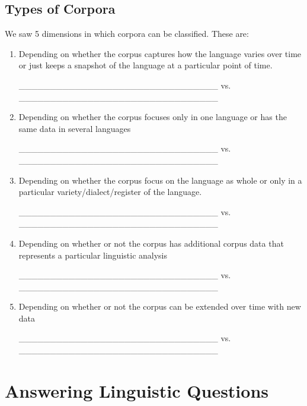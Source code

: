 \documentclass[a4paper,11pt]{scrartcl}
\begin{document}
\subsection{Types of Corpora}

We saw 5 dimensions in which corpora can be classified. These are:

\begin{enumerate}[label=\alph*)]
\onehalfspacing
\item Depending on whether the corpus captures how the language varies over
      time or just keeps a snapshot of the language at a particular point of
      time.

\_\_\_\_\_\_\_\_\_\_\_\_\_\_\_\_\_\_\_\_\_\_\_\_\_\_\_\_\_\_\_\_ vs.
\_\_\_\_\_\_\_\_\_\_\_\_\_\_\_\_\_\_\_\_\_\_\_\_\_\_\_\_\_\_\_\_

\item Depending on whether the corpus focuses only in one language or has the
      same data in several languages

\_\_\_\_\_\_\_\_\_\_\_\_\_\_\_\_\_\_\_\_\_\_\_\_\_\_\_\_\_\_\_\_ vs.
\_\_\_\_\_\_\_\_\_\_\_\_\_\_\_\_\_\_\_\_\_\_\_\_\_\_\_\_\_\_\_\_

\item Depending on whether the corpus focus on the language as whole or only
      in a particular variety/dialect/register of the language.

\_\_\_\_\_\_\_\_\_\_\_\_\_\_\_\_\_\_\_\_\_\_\_\_\_\_\_\_\_\_\_\_ vs.
\_\_\_\_\_\_\_\_\_\_\_\_\_\_\_\_\_\_\_\_\_\_\_\_\_\_\_\_\_\_\_\_

\item Depending on whether or not the corpus has additional corpus data that
      represents a particular linguistic analysis

\_\_\_\_\_\_\_\_\_\_\_\_\_\_\_\_\_\_\_\_\_\_\_\_\_\_\_\_\_\_\_\_ vs.
\_\_\_\_\_\_\_\_\_\_\_\_\_\_\_\_\_\_\_\_\_\_\_\_\_\_\_\_\_\_\_\_

\item Depending on whether or not the corpus can be extended over time with
      new data

\_\_\_\_\_\_\_\_\_\_\_\_\_\_\_\_\_\_\_\_\_\_\_\_\_\_\_\_\_\_\_\_ vs.
\_\_\_\_\_\_\_\_\_\_\_\_\_\_\_\_\_\_\_\_\_\_\_\_\_\_\_\_\_\_\_\_
\end{enumerate}



\section{Answering Linguistic Questions}
\end{document}
